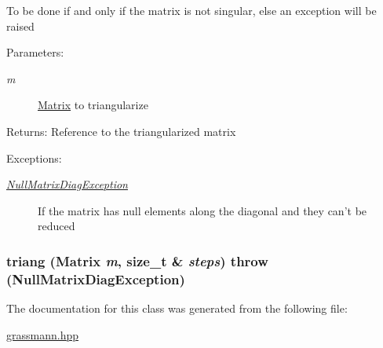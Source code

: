 To be done if and only if the matrix is not singular, else an exception will be raised \begin{Desc}
\item[Parameters:]
\begin{description}
\item[{\em m}]\hyperlink{classgrassmann_1_1Matrix}{Matrix} to triangularize \end{description}
\end{Desc}
\begin{Desc}
\item[Returns:]Reference to the triangularized matrix \end{Desc}
\begin{Desc}
\item[Exceptions:]
\begin{description}
\item[{\em \hyperlink{classgrassmann_1_1NullMatrixDiagException}{NullMatrixDiagException}}]If the matrix has null elements along the diagonal and they can't be reduced \end{description}
\end{Desc}
\hypertarget{classgrassmann_1_1Matrix_f911ce47206805cf2da81b2f3ea1982b}{
\subsubsection[triang]{ triang ({\bf Matrix} {\em m}, \/  size\_\-t \& {\em steps})  throw ({\bf NullMatrixDiagException})}}
\label{classgrassmann_1_1Matrix_f911ce47206805cf2da81b2f3ea1982b}




The documentation for this class was generated from the following file:\begin{CompactItemize}
\item 
\hyperlink{grassmann_8hpp}{grassmann.hpp}\end{CompactItemize}
